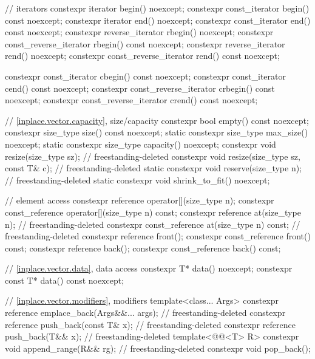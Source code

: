 \begin{codeblock}
{{    // iterators
    constexpr iterator               begin()         noexcept;
    constexpr const_iterator         begin()   const noexcept;
    constexpr iterator               end()           noexcept;
    constexpr const_iterator         end()     const noexcept;
    constexpr reverse_iterator       rbegin()        noexcept;
    constexpr const_reverse_iterator rbegin()  const noexcept;
    constexpr reverse_iterator       rend()          noexcept;
    constexpr const_reverse_iterator rend()    const noexcept;

    constexpr const_iterator         cbegin()  const noexcept;
    constexpr const_iterator         cend()    const noexcept;
    constexpr const_reverse_iterator crbegin() const noexcept;
    constexpr const_reverse_iterator crend()   const noexcept;

    // \ref{inplace.vector.capacity}, size/capacity
    constexpr bool empty() const noexcept;
    constexpr size_type size() const noexcept;
    static constexpr size_type max_size() noexcept;
    static constexpr size_type capacity() noexcept;
    constexpr void resize(size_type sz);                                    // freestanding-deleted
    constexpr void resize(size_type sz, const T& c);                        // freestanding-deleted
    static constexpr void reserve(size_type n);                             // freestanding-deleted
    static constexpr void shrink_to_fit() noexcept;

    // element access
    constexpr reference       operator[](size_type n);
    constexpr const_reference operator[](size_type n) const;
    constexpr reference       at(size_type n);                              // freestanding-deleted
    constexpr const_reference at(size_type n) const;                        // freestanding-deleted
    constexpr reference       front();
    constexpr const_reference front() const;
    constexpr reference       back();
    constexpr const_reference back() const;

    // \ref{inplace.vector.data}, data access
    constexpr       T* data()       noexcept;
    constexpr const T* data() const noexcept;

    // \ref{inplace.vector.modifiers}, modifiers
    template<class... Args>
      constexpr reference emplace_back(Args&&... args);                     // freestanding-deleted
    constexpr reference push_back(const T& x);                              // freestanding-deleted
    constexpr reference push_back(T&& x);                                   // freestanding-deleted
    template<@@<T> R>
      constexpr void append_range(R&& rg);                                  // freestanding-deleted
    constexpr void pop_back();

}}
\end{codeblock}
